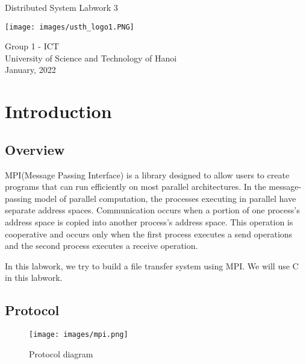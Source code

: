 \documentclass[13pt]{article}
\begin{document}
\begin{titlepage}
    \begin{center}
        \vspace*{1.8cm}
        \Large
        Distributed System Labwork 3\\
        \Large
        \vspace{0.5cm}
        \begin{center}
            \texttt{[image: images/usth\_logo1.PNG]}
        \end{center}  
        \vspace{0.5cm}
            Group 1 - ICT\\
        \vspace{0.5cm}
            University of Science and Technology of Hanoi\\
        \vspace{0.5cm}
            January, 2022
        \vfill
          
   \end{center}
\end{titlepage}

\newpage
\tableofcontents
\newpage


\section{Introduction}
\subsection{Overview}
\noindent%
MPI(Message Passing Interface) is a library designed to allow users to create programs that can run efficiently on most parallel architectures. In the message-passing model of parallel computation, the processes executing in parallel have separate address spaces. Communication occurs when a portion of one process’s address space is copied into another process’s address space. This operation is cooperative and occurs only when the first process executes a send
operations and the second process executes a receive operation.\cite{MPI Concept}

\noindent%
In this labwork, we try to build a file transfer system using MPI. We will use C in this labwork.


\subsection{Protocol}
\begin{figure}[h]
    \centering
    \texttt{[image: images/mpi.png]}
    \caption{Protocol diagram}
    \label{fig:protocol}
\end{figure}
\end{document}
